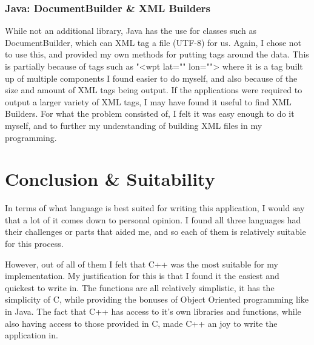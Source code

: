 \documentclass{article}
\begin{document}
\subsubsection{Java: DocumentBuilder \& XML Builders}
While not an additional library, Java has the use for classes such as DocumentBuilder, which can XML tag a file (UTF-8) for us. Again, I chose not to use this, and provided my own methods for putting tags around the data. This is partially because of tags such as "<wpt lat="" lon=""> where it is a tag built up of multiple components I found easier to do myself, and also because of the size and amount of XML tags being output. If the applications were required to output a larger variety of XML tags, I may have found it useful to find XML Builders. For what the problem consisted of, I felt it was easy enough to do it myself, and to further my understanding of building XML files in my programming.




\section{Conclusion \& Suitability}
In terms of what language is best suited for writing this application, I would say that a lot of it comes down to personal opinion. I found all three languages had their challenges or parts that aided me, and so each of them is relatively suitable for this process. 

However, out of all of them I felt that C++  was the most suitable for my implementation. My justification for this is that I found it the easiest and quickest to write in. The functions are all relatively simplistic, it has the simplicity of C, while providing the bonuses of Object Oriented programming like in Java. The fact that C++ has access to it's own libraries and functions, while also having access to those provided in C, made C++ an joy to write the application in.

\clearpage


\begin{thebibliography}{1}



\end{thebibliography}
\end{document}
